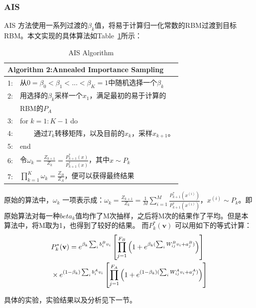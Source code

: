 \documentclass[journal,a4paper]{IEEEtran}
\begin{document}
	\subsubsection{AIS\cite{salakhutdinov2009learning}}
		AIS 方法使用一系列过渡的$\beta_k$值，将易于计算归一化常数的RBM过渡到目标RBM。本文实现的具体算法如Table~\ref{tab2}所示：
		\begin{table}[h]
			\begin{tabular}{ll}
				\hline
				\multicolumn{2}{l}{\textbf{Algorithm 2:}Annealed Importance Sampling} \\
				\hline
				1: & 从$ 0=\beta_0<\beta_1<...<\beta_K=1$中随机选择一个$\beta_k$\\
				2: & 用选择的$\beta_k$采样一个$x_1$，满足最初的易于计算的\\
				 & RBM的$P_A$ \\
				3: & for $k = 1 : K-1$ do \\
				4: & ~~~~通过$T_k$转移矩阵，以及目前的$x_k$，采样$x_{k+1}$。\\
				5: & end \\
				6: & 令$ \omega_k = \frac{Z_{k+1}}{Z_k} = \frac{P_{k+1}^*(x)}{P_{k+1}^*(x)}$，其中$ x \sim P_k$\\
				7: & $ \prod_{k=1}^K\omega_k = \frac{Z_B}{Z_A}$，便可以获得最终结果\\

				\hline
			\end{tabular}
			\caption{AIS Algorithm}
			\label{tab2}
		\end{table}

		原始的算法中，$ \omega_k $ 一项表示成：$ \omega_k = \frac{Z_{k+1}}{Z_k} =\frac{1}{M} \sum_{i = 1}^{M} \frac{P_{k+1}^*(x^{(i)})}{P_{k+1}^*(x^{(i)})}$，$x^{(i)} \sim P_k$。即原始算法对每一种$beta_k$值均作了M次抽样，之后将M次的结果作了平均。但是本算法中，将M取为1，也得到了较好的结果。
		而$P_k^*(\mathbf{v})$ 可以用如下的等式计算：
		\begin{align}
		 & P_k^*(\mathbf{v}) = e^{\beta_k\sum_i b_i^Bv_i} \left[\prod_{j=1}^{F_B} \left(1+e^{\beta_k(\sum_i W_{ij}^Bv_i+a_j^B)}\right)\right] \notag\\
		 & \times e^{(1-\beta_k)\sum_i b_i^Av_i} \left[\prod_{j=1}^{F_A} \left(1+e^{(1-\beta_k)(\sum_i W_{ij}^Av_i+a_j^A)}\right)\right]
		 \label{equ8}
		\end{align}

		具体的实验，实验结果以及分析见下一节。
\end{document}
